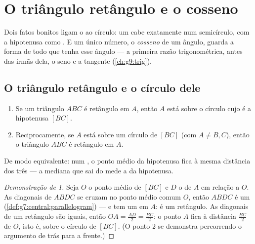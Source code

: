 \chapter{O triângulo retângulo e o cosseno}\label{ch:g8:cosine}

Dois fatos bonitos ligam o  ao círculo: um  cabe exatamente num semicírculo, com a hipotenusa como
. E um único número, o \emph{cosseno} de um ângulo, guarda a
forma de todo  que tenha esse ângulo --- a primeira
razão trigonométrica, antes das irmãs dela, o seno e a tangente
(\cref{ch:g9:trig}).

\section{O triângulo retângulo e o círculo dele}

\begin{theorem}\label{thm:g8:cosine:circle}
\begin{enumerate}
  \item Se um triângulo $ABC$ é retângulo em $A$, então $A$ está sobre
        o círculo cujo  é a hipotenusa $[BC]$.
  \item Reciprocamente, se $A$ está sobre um círculo de  $[BC]$
        (com $A \neq B, C$), então o triângulo $ABC$ é retângulo em
        $A$.
\end{enumerate}
De modo equivalente: num , o ponto médio da
hipotenusa fica à mesma distância dos três  --- a mediana que
sai do  mede a  da hipotenusa.
\end{theorem}

\begin{proof}[Demonstração de 1]
Seja $O$ o ponto médio de $[BC]$ e $D$ o  de $A$ em relação a
$O$. As diagonais de $ABDC$ se cruzam no ponto médio comum $O$, então
$ABDC$ é um 
(\cref{def:g7:central:parallelogram}) --- e tem um  em $A$:
é um retângulo. As diagonais de um retângulo são iguais, então
$OA = \frac{AD}{2} = \frac{BC}{2}$: o ponto $A$ fica à distância
$\frac{BC}{2}$ de $O$, isto é, sobre o círculo de  $[BC]$. (O
ponto 2 se demonstra percorrendo o argumento de trás para a frente.)
\end{proof}

